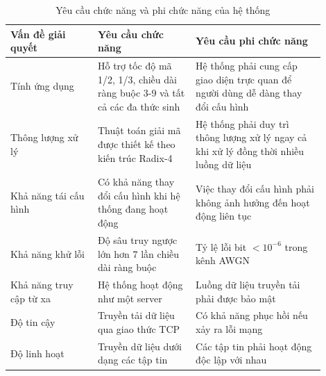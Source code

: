 \documentclass[../DoAn.tex]{subfiles}
\begin{document}
\begin{table}[H]
\centering{}
    \caption{Yêu cầu chức năng và phi chức năng của hệ thống}
    \begin{tabular}{|p{0.25\linewidth} |p{0.28\linewidth} |p{0.37\linewidth}|}
        \hline
        \textbf{Vấn đề giải quyết} & \textbf{Yêu cầu chức năng}  & \textbf{Yêu cầu phi chức năng}\\ \hline\hline
        Tính ứng dụng  & Hỗ trợ tốc độ mã 1/2, 1/3, chiều dài ràng buộc 3-9 và tất cả các đa thức sinh  & Hệ thống phải cung cấp giao diện trực quan để người dùng dễ dàng thay đổi cấu hình\\ \hline
        Thông lượng xử lý  & Thuật toán giải mã được thiết kế theo kiến trúc Radix-4 \cite{black_140-mbs_1992}  & Hệ thống phải duy trì thông lượng xử lý ngay cả khi xử lý đồng thời nhiều luồng dữ liệu\\ \hline
        Khả năng tái cấu hình  & Có khả năng thay đổi cấu hình khi hệ thống đang hoạt động   & Việc thay đổi cấu hình phải không ảnh hưởng đến hoạt động liên tục\\ \hline
        Khả năng khử lỗi  & Độ sâu truy ngược lớn hơn 7 lần chiều dài ràng buộc \cite{a_viterbi_error_nodate}  & Tỷ lệ lỗi bit $<10^{-6}$ trong kênh AWGN \\ \hline
        Khả năng truy cập từ xa   &  Hệ thống hoạt động như một server  &  Luồng dữ liệu truyền tải phải được bảo mật\\ \hline
        Độ tin cậy  & Truyền tải dữ liệu qua giao thức TCP   & Có khả năng phục hồi nếu xảy ra lỗi mạng\\ \hline
        Độ linh hoạt  & Truyền dữ liệu dưới dạng các tập tin  & Các tập tin phải hoạt động độc lập với nhau\\ \hline
        \end{tabular}
\end{table}
\end{document}
